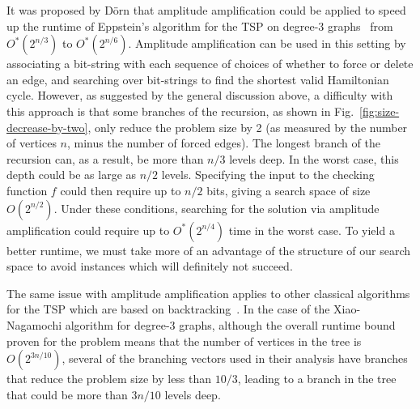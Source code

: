 It was proposed by D\"orn \cite{dorn2007} that amplitude amplification could be applied to speed up the runtime of Eppstein's algorithm for the TSP on degree-3 graphs~\cite{eppstein2007} from $O^*(2^{n/3})$ to $O^*(2^{n/6})$. Amplitude amplification can be used in this setting by associating a bit-string with each sequence of choices of whether to force or delete an edge, and searching over bit-strings to find the shortest valid Hamiltonian cycle. However, as suggested by the general discussion above, a difficulty with this approach is that some branches of the recursion, as shown in Fig.~\ref{fig:size-decrease-by-two}, only reduce the problem size by 2 (as measured by the number of vertices $n$, minus the number of forced edges). The longest branch of the recursion can, as a result, be more than $n/3$ levels deep. In the worst case, this depth could be as large as $n/2$ levels. Specifying the input to the checking function $f$ could then require up to $n/2$ bits, giving a search space of size $O(2^{n/2})$. Under these conditions, searching for the solution via amplitude amplification could require up to $O^*(2^{n/4})$ time in the worst case. To yield a better runtime, we must take more of an advantage of the structure of our search space to avoid instances which will definitely not succeed.

The same issue with amplitude amplification applies to other classical algorithms for the TSP which are based on backtracking~\cite{xiao2016degree3,xiao2016degree4}. In the case of the Xiao-Nagamochi algorithm for degree-3 graphs, although the overall runtime bound proven for the problem means that the number of vertices in the tree is $O(2^{3n/10})$, several of the branching vectors used in their analysis have branches that reduce the problem size by less than $10/3$, leading to a branch in the tree that could be more than $3n/10$ levels deep.


